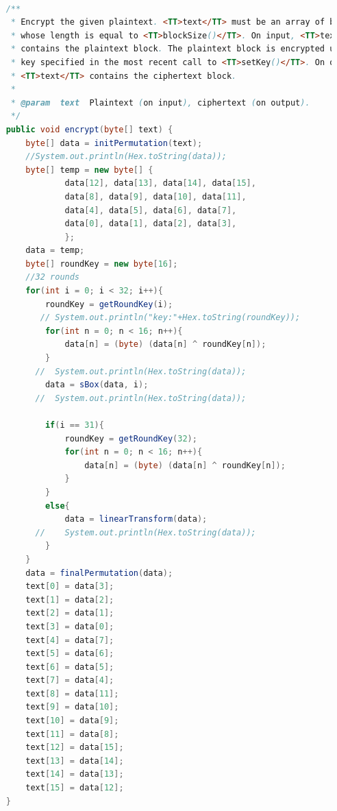 \documentclass[12pt]{article} %
\begin{document}
\begin{lstlisting}[language=Java, basicstyle=\small, breaklines=true]
    
    /**
     * Encrypt the given plaintext. <TT>text</TT> must be an array of bytes
     * whose length is equal to <TT>blockSize()</TT>. On input, <TT>text</TT>
     * contains the plaintext block. The plaintext block is encrypted using the
     * key specified in the most recent call to <TT>setKey()</TT>. On output,
     * <TT>text</TT> contains the ciphertext block.
     *
     * @param  text  Plaintext (on input), ciphertext (on output).
     */
    public void encrypt(byte[] text) {
		byte[] data = initPermutation(text);
		//System.out.println(Hex.toString(data));
		byte[] temp = new byte[] {
				data[12], data[13], data[14], data[15],
				data[8], data[9], data[10], data[11],
				data[4], data[5], data[6], data[7],
				data[0], data[1], data[2], data[3],
				};
		data = temp;
        byte[] roundKey = new byte[16];
        //32 rounds
        for(int i = 0; i < 32; i++){
            roundKey = getRoundKey(i);
           // System.out.println("key:"+Hex.toString(roundKey));
            for(int n = 0; n < 16; n++){
                data[n] = (byte) (data[n] ^ roundKey[n]);
            }
          //  System.out.println(Hex.toString(data));
            data = sBox(data, i);
          //  System.out.println(Hex.toString(data));
            
            if(i == 31){
            	roundKey = getRoundKey(32);
                for(int n = 0; n < 16; n++){
                    data[n] = (byte) (data[n] ^ roundKey[n]);
                } 
            }
            else{
            	data = linearTransform(data);
          //  	System.out.println(Hex.toString(data));
            }
        }
        data = finalPermutation(data);   
        text[0] = data[3];
        text[1] = data[2];
        text[2] = data[1];
        text[3] = data[0];
        text[4] = data[7];
        text[5] = data[6];
        text[6] = data[5];
        text[7] = data[4];
        text[8] = data[11];
        text[9] = data[10];
        text[10] = data[9];
        text[11] = data[8];
        text[12] = data[15];
        text[13] = data[14];
        text[14] = data[13];
        text[15] = data[12];
    }


\end{lstlisting}
\end{document}
